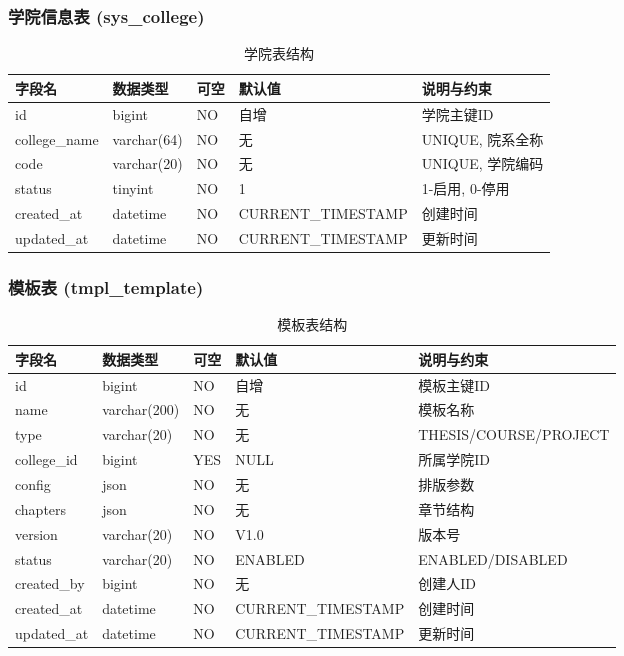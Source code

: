 \documentclass{../template/softeng}
\begin{document}
	\subsubsection{学院信息表 (sys\_college)}
	\begin{table}[htbp]
		\centering
		\begin{tabular}{|l|l|l|l|l|}
			\hline
			\textbf{字段名} & \textbf{数据类型} & \textbf{可空} & \textbf{默认值} & \textbf{说明与约束} \\
			\hline
			id & bigint & NO & 自增 & 学院主键ID \\
			college\_name & varchar(64) & NO & 无 & UNIQUE, 院系全称 \\
			code & varchar(20) & NO & 无 & UNIQUE, 学院编码 \\
			status & tinyint & NO & 1 & 1-启用, 0-停用 \\
			created\_at & datetime & NO & CURRENT\_TIMESTAMP & 创建时间 \\
			updated\_at & datetime & NO & CURRENT\_TIMESTAMP & 更新时间 \\
			\hline
		\end{tabular}
		\caption{学院表结构}
	\end{table}

	\subsubsection{模板表 (tmpl\_template)}
	\begin{table}[htbp]
		\centering
		\begin{tabular}{|l|l|l|l|l|}
			\hline
			\textbf{字段名} & \textbf{数据类型} & \textbf{可空} & \textbf{默认值} & \textbf{说明与约束} \\
			\hline
			id & bigint & NO & 自增 & 模板主键ID \\
			name & varchar(200) & NO & 无 & 模板名称 \\
			type & varchar(20) & NO & 无 & THESIS/COURSE/PROJECT \\
			college\_id & bigint & YES & NULL & 所属学院ID \\
			config & json & NO & 无 & 排版参数 \\
			chapters & json & NO & 无 & 章节结构 \\
			version & varchar(20) & NO & V1.0 & 版本号 \\
			status & varchar(20) & NO & ENABLED & ENABLED/DISABLED \\
			created\_by & bigint & NO & 无 & 创建人ID \\
			created\_at & datetime & NO & CURRENT\_TIMESTAMP & 创建时间 \\
			updated\_at & datetime & NO & CURRENT\_TIMESTAMP & 更新时间 \\
			\hline
		\end{tabular}
		\caption{模板表结构}
	\end{table}
\end{document}
